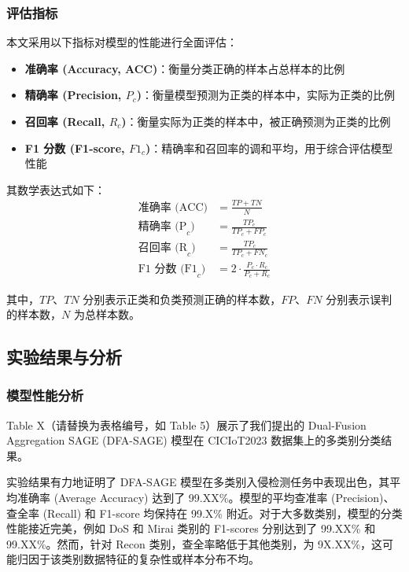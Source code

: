 \documentclass{article}
\begin{document}
\subsubsection{评估指标}
本文采用以下指标对模型的性能进行全面评估：
\begin{itemize}
  \item \textbf{准确率 (Accuracy, ACC)}：衡量分类正确的样本占总样本的比例
  \item \textbf{精确率 (Precision, $P_c$)}：衡量模型预测为正类的样本中，实际为正类的比例
  \item \textbf{召回率 (Recall, $R_c$)}：衡量实际为正类的样本中，被正确预测为正类的比例
  \item \textbf{F1 分数 (F1-score, $F1_c$)}：精确率和召回率的调和平均，用于综合评估模型性能
\end{itemize}

其数学表达式如下：
\begin{align}
  \text{准确率 (ACC)} &= \frac{TP + TN}{N} \label{eq:accuracy} \\
  \text{精确率 (P}_c\text{)} &= \frac{TP_c}{TP_c + FP_c} \label{eq:precision} \\
  \text{召回率 (R}_c\text{)} &= \frac{TP_c}{TP_c + FN_c} \label{eq:recall} \\
  \text{F1 分数 (F1}_c\text{)} &= 2 \cdot \frac{P_c \cdot R_c}{P_c +
  R_c} \label{eq:f1score}
\end{align}

其中，$TP$、$TN$ 分别表示正类和负类预测正确的样本数，$FP$、$FN$ 分别表示误判的样本数，$N$ 为总样本数。
\subsection{实验结果与分析}

\subsubsection{模型性能分析}

Table X（请替换为表格编号，如 Table 5）展示了我们提出的 Dual-Fusion Aggregation SAGE
(DFA-SAGE) 模型在 CICIoT2023 数据集上的多类别分类结果。

实验结果有力地证明了 DFA-SAGE 模型在多类别入侵检测任务中表现出色，其平均准确率 (Average Accuracy) 达到了
99.XX\%。模型的平均查准率 (Precision)、查全率 (Recall) 和 F1-score 均保持在 99.X\%
附近。对于大多数类别，模型的分类性能接近完美，例如 DoS 和 Mirai 类别的 F1-scores 分别达到了 99.XX\% 和
99.XX\%。然而，针对 Recon 类别，查全率略低于其他类别，为 9X.XX\%，这可能归因于该类别数据特征的复杂性或样本分布不均。
\end{document}
